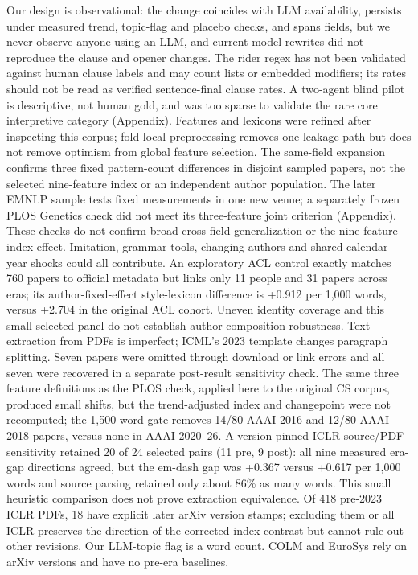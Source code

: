 \documentclass[10pt,twocolumn]{article}
\begin{document}
Our design is observational: the change coincides with LLM availability, persists under measured trend, topic-flag and placebo checks, and spans fields, but we never observe anyone using an LLM, and current-model rewrites did not reproduce the clause and opener changes. The rider regex has not been validated against human clause labels and may count lists or embedded modifiers; its rates should not be read as verified sentence-final clause rates. A two-agent blind pilot is descriptive, not human gold, and was too sparse to validate the rare core interpretive category (Appendix). Features and lexicons were refined after inspecting this corpus; fold-local preprocessing removes one leakage path but does not remove optimism from global feature selection. The same-field expansion confirms three fixed pattern-count differences in disjoint sampled papers, not the selected nine-feature index or an independent author population. The later EMNLP sample tests fixed measurements in one new venue; a separately frozen PLOS Genetics check did not meet its three-feature joint criterion (Appendix). These checks do not confirm broad cross-field generalization or the nine-feature index effect. Imitation, grammar tools, changing authors and shared calendar-year shocks could all contribute. An exploratory ACL control exactly matches 760 papers to official metadata but links only 11 people and 31 papers across eras; its author-fixed-effect style-lexicon difference is +0.912 per 1,000 words, versus +2.704 in the original ACL cohort. Uneven identity coverage and this small selected panel do not establish author-composition robustness. Text extraction from PDFs is imperfect; ICML's 2023 template changes paragraph splitting. Seven papers were omitted through download or link errors and all seven were recovered in a separate post-result sensitivity check. The same three feature definitions as the PLOS check, applied here to the original CS corpus, produced small shifts, but the trend-adjusted index and changepoint were not recomputed; the 1,500-word gate removes 14/80 AAAI 2016 and 12/80 AAAI 2018 papers, versus none in AAAI 2020--26. A version-pinned ICLR source/PDF sensitivity retained 20 of 24 selected pairs (11 pre, 9 post): all nine measured era-gap directions agreed, but the em-dash gap was +0.367 versus +0.617 per 1,000 words and source parsing retained only about 86\% as many words. This small heuristic comparison does not prove extraction equivalence. Of 418 pre-2023 ICLR PDFs, 18 have explicit later arXiv version stamps; excluding them or all ICLR preserves the direction of the corrected index contrast but cannot rule out other revisions. Our LLM-topic flag is a word count. COLM and EuroSys rely on arXiv versions and have no pre-era baselines.
\end{document}
